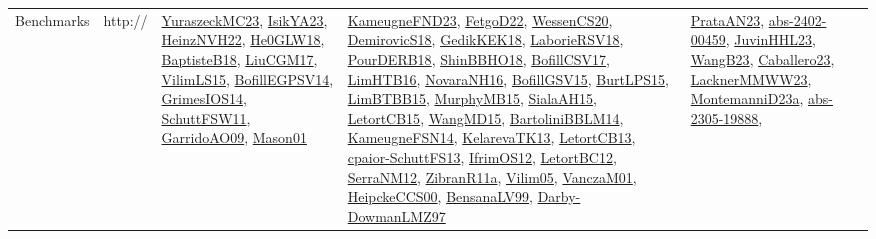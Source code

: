 {\begin{longtable}{lp{3cm}>{\raggedright}p{6cm}>{\raggedright}p{6cm}p{8cm}}
Benchmarks & http:// & \href{papers/YuraszeckMC23.pdf}{YuraszeckMC23}\cite{YuraszeckMC23}, \href{articles/IsikYA23.pdf}{IsikYA23}\cite{IsikYA23}, \href{articles/HeinzNVH22.pdf}{HeinzNVH22}\cite{HeinzNVH22}, \href{papers/He0GLW18.pdf}{He0GLW18}\cite{He0GLW18}, \href{articles/BaptisteB18.pdf}{BaptisteB18}\cite{BaptisteB18}, \href{papers/LiuCGM17.pdf}{LiuCGM17}\cite{LiuCGM17}, \href{papers/VilimLS15.pdf}{VilimLS15}\cite{VilimLS15}, \href{papers/BofillEGPSV14.pdf}{BofillEGPSV14}\cite{BofillEGPSV14}, \href{articles/GrimesIOS14.pdf}{GrimesIOS14}\cite{GrimesIOS14}, \href{articles/SchuttFSW11.pdf}{SchuttFSW11}\cite{SchuttFSW11}, \href{articles/GarridoAO09.pdf}{GarridoAO09}\cite{GarridoAO09}, \href{articles/Mason01.pdf}{Mason01}\cite{Mason01} & \href{papers/KameugneFND23.pdf}{KameugneFND23}\cite{KameugneFND23}, \href{articles/FetgoD22.pdf}{FetgoD22}\cite{FetgoD22}, \href{papers/WessenCS20.pdf}{WessenCS20}\cite{WessenCS20}, \href{papers/DemirovicS18.pdf}{DemirovicS18}\cite{DemirovicS18}, \href{articles/GedikKEK18.pdf}{GedikKEK18}\cite{GedikKEK18}, \href{articles/LaborieRSV18.pdf}{LaborieRSV18}\cite{LaborieRSV18}, \href{articles/PourDERB18.pdf}{PourDERB18}\cite{PourDERB18}, \href{articles/ShinBBHO18.pdf}{ShinBBHO18}\cite{ShinBBHO18}, \href{papers/BofillCSV17.pdf}{BofillCSV17}\cite{BofillCSV17}, \href{papers/LimHTB16.pdf}{LimHTB16}\cite{LimHTB16}, \href{articles/NovaraNH16.pdf}{NovaraNH16}\cite{NovaraNH16}, \href{papers/BofillGSV15.pdf}{BofillGSV15}\cite{BofillGSV15}, \href{papers/BurtLPS15.pdf}{BurtLPS15}\cite{BurtLPS15}, \href{papers/LimBTBB15.pdf}{LimBTBB15}\cite{LimBTBB15}, \href{papers/MurphyMB15.pdf}{MurphyMB15}\cite{MurphyMB15}, \href{papers/SialaAH15.pdf}{SialaAH15}\cite{SialaAH15}, \href{articles/LetortCB15.pdf}{LetortCB15}\cite{LetortCB15}, \href{articles/WangMD15.pdf}{WangMD15}\cite{WangMD15}, \href{papers/BartoliniBBLM14.pdf}{BartoliniBBLM14}\cite{BartoliniBBLM14}, \href{articles/KameugneFSN14.pdf}{KameugneFSN14}\cite{KameugneFSN14}, \href{papers/KelarevaTK13.pdf}{KelarevaTK13}\cite{KelarevaTK13}, \href{papers/LetortCB13.pdf}{LetortCB13}\cite{LetortCB13}, \href{papers/cpaior-SchuttFS13.pdf}{cpaior-SchuttFS13}\cite{cpaior-SchuttFS13}, \href{papers/IfrimOS12.pdf}{IfrimOS12}\cite{IfrimOS12}, \href{papers/LetortBC12.pdf}{LetortBC12}\cite{LetortBC12}, \href{papers/SerraNM12.pdf}{SerraNM12}\cite{SerraNM12}, \href{papers/ZibranR11a.pdf}{ZibranR11a}\cite{ZibranR11a}, \href{papers/Vilim05.pdf}{Vilim05}\cite{Vilim05}, \href{papers/VanczaM01.pdf}{VanczaM01}\cite{VanczaM01}, \href{articles/HeipckeCCS00.pdf}{HeipckeCCS00}\cite{HeipckeCCS00}, \href{articles/BensanaLV99.pdf}{BensanaLV99}\cite{BensanaLV99}, \href{articles/Darby-DowmanLMZ97.pdf}{Darby-DowmanLMZ97}\cite{Darby-DowmanLMZ97} & \href{articles/PrataAN23.pdf}{PrataAN23}\cite{PrataAN23}, \href{articles/abs-2402-00459.pdf}{abs-2402-00459}\cite{abs-2402-00459}, \href{papers/JuvinHHL23.pdf}{JuvinHHL23}\cite{JuvinHHL23}, \href{papers/WangB23.pdf}{WangB23}\cite{WangB23}, \href{articles/Caballero23.pdf}{Caballero23}\cite{Caballero23}, \href{articles/LacknerMMWW23.pdf}{LacknerMMWW23}\cite{LacknerMMWW23}, \href{articles/MontemanniD23a.pdf}{MontemanniD23a}\cite{MontemanniD23a}, \href{articles/abs-2305-19888.pdf}{abs-2305-19888}\cite{abs-2305-19888}, 
\end{longtable}}
